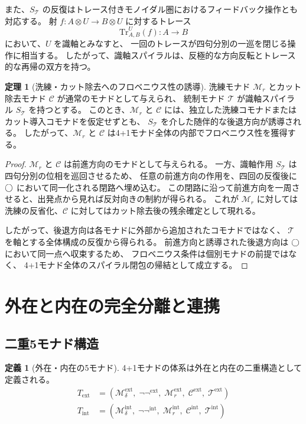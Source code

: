 \documentclass[11pt,a4paper]{article}
\newcommand{\Mr}{\mathcal{M}_r}
\newcommand{\Md}{\mathcal{M}_\delta}
\newcommand{\Mnn}{\neg\neg}
\newcommand{\MC}{\mathcal{C}}
\newcommand{\MT}{\mathcal{T}}
\newcommand{\Text}{T_{\mathrm{ext}}}
\newcommand{\Tint}{T_{\mathrm{int}}}
\theoremstyle{definition}
\newtheorem{definition}{定義}[section]
\newtheorem{theorem}{定理}[section]
\begin{document}
また、$S_{\MT}$ の反復はトレース付きモノイダル圏におけるフィードバック操作とも対応する\cite{Joyal1996}。
射 $f:A\otimes U\to B\otimes U$ に対するトレース
\begin{equation}
  \mathrm{Tr}^{U}_{A,B}(f): A \to B
\end{equation}
において、$U$ を識軸とみなすと、
一回のトレースが四句分別の一巡を閉じる操作に相当する。
したがって、識軸スパイラルは、反極的な方向反転とトレース的な再帰の双方を持つ。

\begin{theorem}[洗練・カット除去へのフロベニウス性の誘導]
洗練モナド $\Mr$ とカット除去モナド $\MC$ が通常のモナドとして与えられ、
統制モナド $\MT$ が識軸スパイラル $S_{\MT}$ を持つとする。
このとき、$\Mr$ と $\MC$ には、独立した洗練コモナドまたはカット導入コモナドを仮定せずとも、
$S_{\MT}$ を介した随伴的な後退方向が誘導される。
したがって、$\Mr$ と $\MC$ は4+1モナド全体の内部でフロベニウス性を獲得する。
\end{theorem}

\begin{proof}
$\Mr$ と $\MC$ は前進方向のモナドとして与えられる。
一方、識軸作用 $S_{\MT}$ は四句分別の位相を巡回させるため、
任意の前進方向の作用を、四回の反復後に $\bigcirc$ において同一化される閉路へ埋め込む。
この閉路に沿って前進方向を一周させると、出発点から見れば反対向きの制約が得られる。
これが $\Mr$ に対しては洗練の反省化、$\MC$ に対してはカット除去後の残余確定として現れる。

したがって、後退方向は各モナドに外部から追加されたコモナドではなく、
$\MT$ を軸とする全体構成の反復から得られる。
前進方向と誘導された後退方向は $\bigcirc$ において同一点へ収束するため、
フロベニウス条件は個別モナドの前提ではなく、
4+1モナド全体のスパイラル閉包の帰結として成立する。
\end{proof}

\section{外在と内在の完全分離と連携}
\label{sec:ext-int}

\subsection{二重5モナド構造}

\begin{definition}[外在・内在の5モナド]
4+1モナドの体系は外在と内在の二重構造として定義される。
\begin{align}
  \Text &= (\Md^{\mathrm{ext}},\;\Mnn^{\mathrm{ext}},\;\Mr^{\mathrm{ext}},\;
            \MC^{\mathrm{ext}},\;\MT^{\mathrm{ext}}) \\
  \Tint &= (\Md^{\mathrm{int}},\;\Mnn^{\mathrm{int}},\;\Mr^{\mathrm{int}},\;
            \MC^{\mathrm{int}},\;\MT^{\mathrm{int}})
\end{align}
\end{definition}
\end{document}

